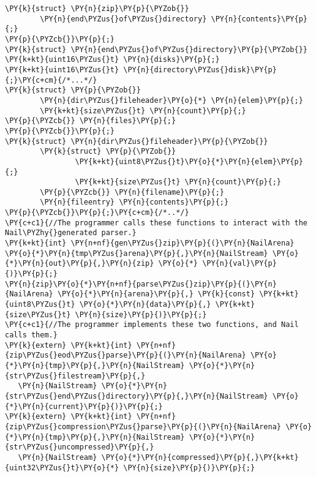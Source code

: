 \begin{Verbatim}[commandchars=\\\{\},codes={\catcode`\$=3\catcode`\^=7\catcode`\_=8}]
\PY{k}{struct} \PY{n}{zip}\PY{p}{\PYZob{}}
        \PY{n}{end\PYZus{}of\PYZus{}directory} \PY{n}{contents}\PY{p}{;}
\PY{p}{\PYZcb{}}\PY{p}{;}
\PY{k}{struct} \PY{n}{end\PYZus{}of\PYZus{}directory}\PY{p}{\PYZob{}}
\PY{k+kt}{uint16\PYZus{}t} \PY{n}{disks}\PY{p}{;}
\PY{k+kt}{uint16\PYZus{}t} \PY{n}{directory\PYZus{}disk}\PY{p}{;}\PY{c+cm}{/*...*/}
\PY{k}{struct} \PY{p}{\PYZob{}}
        \PY{n}{dir\PYZus{}fileheader}\PY{o}{*} \PY{n}{elem}\PY{p}{;}
        \PY{k+kt}{size\PYZus{}t} \PY{n}{count}\PY{p}{;}
\PY{p}{\PYZcb{}} \PY{n}{files}\PY{p}{;}
\PY{p}{\PYZcb{}}\PY{p}{;}
\PY{k}{struct} \PY{n}{dir\PYZus{}fileheader}\PY{p}{\PYZob{}}
        \PY{k}{struct} \PY{p}{\PYZob{}}
                \PY{k+kt}{uint8\PYZus{}t}\PY{o}{*}\PY{n}{elem}\PY{p}{;}
                \PY{k+kt}{size\PYZus{}t} \PY{n}{count}\PY{p}{;}
        \PY{p}{\PYZcb{}} \PY{n}{filename}\PY{p}{;}
        \PY{n}{fileentry} \PY{n}{contents}\PY{p}{;}
\PY{p}{\PYZcb{}}\PY{p}{;}\PY{c+cm}{/*..*/}
\PY{c+c1}{//The programmer calls these functions to interact with the Nail\PYZhy{}generated parser.}
\PY{k+kt}{int} \PY{n+nf}{gen\PYZus{}zip}\PY{p}{(}\PY{n}{NailArena} \PY{o}{*}\PY{n}{tmp\PYZus{}arena}\PY{p}{,}\PY{n}{NailStream} \PY{o}{*}\PY{n}{out}\PY{p}{,}\PY{n}{zip} \PY{o}{*} \PY{n}{val}\PY{p}{)}\PY{p}{;}
\PY{n}{zip}\PY{o}{*}\PY{n+nf}{parse\PYZus{}zip}\PY{p}{(}\PY{n}{NailArena} \PY{o}{*}\PY{n}{arena}\PY{p}{,} \PY{k}{const} \PY{k+kt}{uint8\PYZus{}t} \PY{o}{*}\PY{n}{data}\PY{p}{,} \PY{k+kt}{size\PYZus{}t} \PY{n}{size}\PY{p}{)}\PY{p}{;}
\PY{c+c1}{//The programmer implements these two functions, and Nail calls them.}
\PY{k}{extern} \PY{k+kt}{int} \PY{n+nf}{zip\PYZus{}eod\PYZus{}parse}\PY{p}{(}\PY{n}{NailArena} \PY{o}{*}\PY{n}{tmp}\PY{p}{,}\PY{n}{NailStream} \PY{o}{*}\PY{n}{str\PYZus{}filestream}\PY{p}{,}
   \PY{n}{NailStream} \PY{o}{*}\PY{n}{str\PYZus{}end\PYZus{}directory}\PY{p}{,}\PY{n}{NailStream} \PY{o}{*}\PY{n}{current}\PY{p}{)}\PY{p}{;}
\PY{k}{extern} \PY{k+kt}{int} \PY{n+nf}{zip\PYZus{}compression\PYZus{}parse}\PY{p}{(}\PY{n}{NailArena} \PY{o}{*}\PY{n}{tmp}\PY{p}{,}\PY{n}{NailStream} \PY{o}{*}\PY{n}{str\PYZus{}uncompressed}\PY{p}{,}
   \PY{n}{NailStream} \PY{o}{*}\PY{n}{compressed}\PY{p}{,}\PY{k+kt}{uint32\PYZus{}t}\PY{o}{*} \PY{n}{size}\PY{p}{)}\PY{p}{;}
\end{Verbatim}
